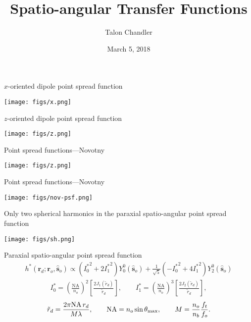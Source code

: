 \documentclass[presentation]{beamer}
\author{Talon Chandler}
\date{March 5, 2018}
\title{Spatio-angular Transfer Functions}
\providecommand{\so}[1]{\mathbf{\hat{s}}_o}
\providecommand{\rd}[1]{\mathbf{r}_d}
\begin{document}
\maketitle
\begin{frame}[label=sec-1]{$x$-oriented dipole point spread function}
 \begin{center}
   \texttt{[image: figs/x.png]}
 \end{center}
\end{frame}

\begin{frame}[label=sec-1]{$z$-oriented dipole point spread function}
 \begin{center}
   \texttt{[image: figs/z.png]}
 \end{center}
\end{frame}

\begin{frame}[label=sec-1]{Point spread functions---Novotny}
 \begin{center}
   \texttt{[image: figs/z.png]}
 \end{center}
\end{frame}

\begin{frame}[label=sec-1]{Point spread functions---Novotny}
 \begin{center}
   \texttt{[image: figs/nov-psf.png]}
 \end{center}
\end{frame}

\begin{frame}[label=sec-1]{Only two spherical harmonics in the paraxial spatio-angular point spread function}
 \begin{center}
   \texttt{[image: figs/sh.png]}
 \end{center}
\end{frame}

\begin{frame}{Paraxial spatio-angular point spread function}
\begin{align*}
      h^*(\rd{}; \mathbf{r}_o, \so{}) \propto ({I_0^*}^2 + 2{I_1^*}^2)Y_0^0(\so{}) + \frac{1}{\sqrt{5}}\left(-{I_0^*}^2 + 4{I_1^*}^2\right)Y_2^{0}(\so{})\label{eq:para}
\end{align*}
\begin{align*}
  {I_0^*} = \left(\frac{\text{NA}}{n_o}\right)^2\left[\frac{2J_1(\tilde{r}_d)}{\tilde{r}_d}\right],
  \hspace{2em}
  {I_1^*} = \left(\frac{\text{NA}}{n_o}\right)^3\left[\frac{2J_2(\tilde{r}_d)}{\tilde{r}_d}\right],
  \end{align*}
  \begin{align*}
  \tilde{r}_d = \frac{2\pi\text{NA}\thinspace r_d}{M\lambda},\hspace{2em}
  \text{NA} = n_o\sin\theta_{\text{max}},\hspace{2em}
  M = \frac{n_o}{n_b}\frac{f_t}{f_o}.
\end{align*}
\end{frame}
\end{document}
